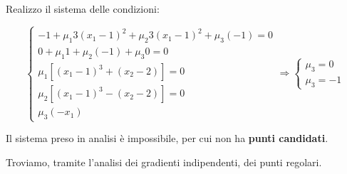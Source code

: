 \documentclass[\main/main.tex]{subfiles}
\begin{document}
Realizzo il sistema delle condizioni:

\[
	\begin{cases}
		-1 + \mu_1 3(x_1 -1)^2 + \mu_2 3(x_1-1)^2 + \mu_3(-1) = 0 \\
		0 + \mu_1 1 + \mu_2 (-1) + \mu_3 0 = 0                    \\
		\mu_1 [(x_1 - 1)^3 + (x_2-2)] = 0                         \\
		\mu_2 [(x_1 - 1)^3 - (x_2-2)] = 0                         \\
		\mu_3 (-x_1)
	\end{cases}
	\Rightarrow
	\begin{cases}
		\mu_3 = 0 \\
		\mu_3 = -1
	\end{cases}
\]

Il sistema preso in analisi è impossibile, per cui non ha \textbf{punti candidati}.

Troviamo, tramite l'analisi dei gradienti indipendenti, dei punti regolari.
\end{document}
